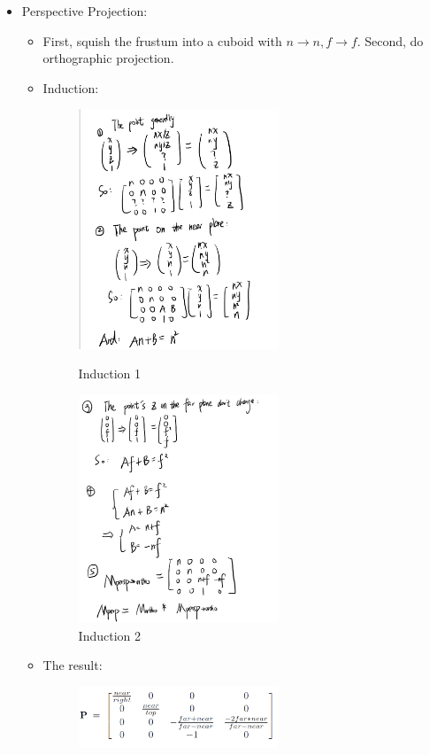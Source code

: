 \documentclass{article}
\begin{document}
\begin{itemize}
\begin{itemize}
\begin{figure}[H]
\end{figure}

\end{itemize}
\item Perspective Projection:
\begin{itemize}
    \item First, squish the frustum into a cuboid with $n\rightarrow n, f\rightarrow f$. Second, do orthographic projection.
    \item Induction:
\begin{figure}[H]
\centering
\begin{minipage}[t]{0.48\textwidth}
\centering
\includegraphics[width=6cm]{imgs/process1.jpeg}
\caption{Induction 1}
\end{minipage}
\begin{minipage}[t]{0.48\textwidth}
\centering
\includegraphics[width=6cm]{imgs/process2.jpeg}
\caption{Induction 2}
\end{minipage}
\end{figure}

\item The result:
\begin{figure}[H]
    \centering
    \includegraphics[width=0.6\textwidth]{imgs/pers_proj.jpeg}


\end{figure}
\end{itemize}
\end{itemize}
\end{document}
